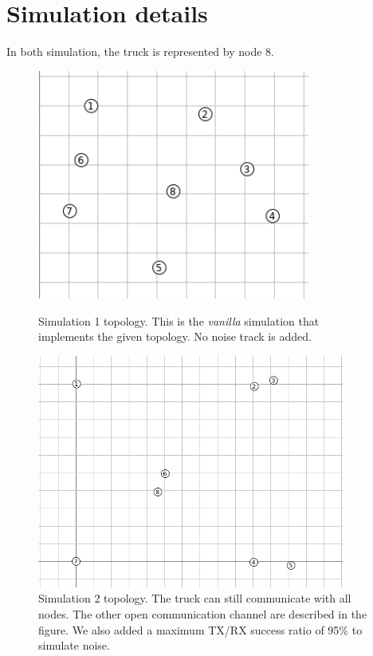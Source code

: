 \documentclass[a4paper, 11pt, parskip=half]{scrartcl}
\begin{document}
\section{Simulation details}

In both simulation, the truck is represented by node 8.

\begin{figure}[ht]
    \begin{minipage}[t]{0.47\textwidth}
        \centering
        \includegraphics[width=0.8\textwidth]{resources/sim1}
        \caption{Simulation 1 topology. This is the \textit{vanilla} simulation that implements the given topology. No noise track is added.}
    \end{minipage}
    \hspace*{\fill}
    \begin{minipage}[t]{0.47\textwidth}
        \centering
        \includegraphics[width=0.9\textwidth]{resources/sim2}
        \caption{Simulation 2 topology. The truck can still communicate with all nodes. The other open communication channel are described in the figure. We also added a maximum TX/RX success ratio of 95\% to simulate noise.}
    \end{minipage}
\end{figure}
\end{document}
